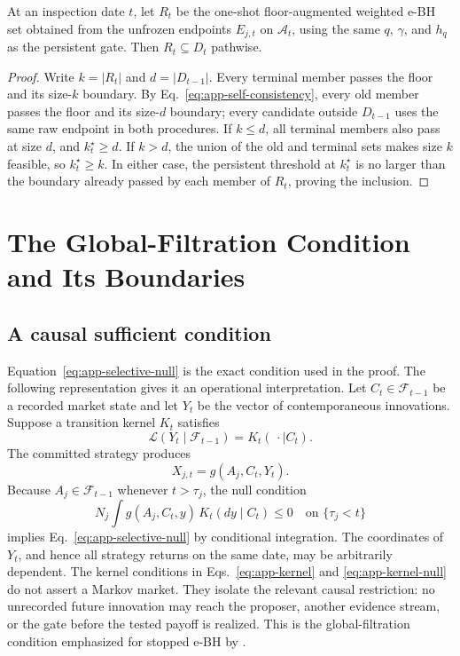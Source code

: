 \begin{proposition}
\label{prop:app-terminal-containment}
At an inspection date \(t\), let \(R_t\) be the one-shot floor-augmented
weighted e-BH set obtained from the unfrozen endpoints \(E_{j,t}\) on
\(\mathcal A_t\), using the same \(q\), \(\gamma\), and \(h_q\) as the
persistent gate.  Then \(R_t\subseteq D_t\) pathwise.
\end{proposition}

\begin{proof}
Write \(k=|R_t|\) and \(d=|D_{t-1}|\).  Every terminal member passes the
floor and its size-\(k\) boundary.  By
Eq.~\eqref{eq:app-self-consistency}, every old member passes the floor and its
size-\(d\) boundary; every candidate outside \(D_{t-1}\) uses the same raw
endpoint in both procedures.  If \(k\leq d\), all terminal members also pass
at size \(d\), and \(k_t^\star\geq d\).  If \(k>d\), the union of the old and
terminal sets makes size \(k\) feasible, so \(k_t^\star\geq k\).  In either
case, the persistent threshold at \(k_t^\star\) is no larger than the boundary
already passed by each member of \(R_t\), proving the inclusion.
\end{proof}

\section{The Global-Filtration Condition and Its Boundaries}
\label{app:causal}

\subsection{A causal sufficient condition}

Equation~\eqref{eq:app-selective-null} is the exact condition used in the
proof.  The following representation gives it an operational interpretation.
Let \(C_t\in\mathcal F_{t-1}\) be a recorded market state and let \(Y_t\) be
the vector of contemporaneous innovations.  Suppose a transition kernel
\(K_t\) satisfies
\begin{equation}
  \mathcal L(Y_t\mid\mathcal F_{t-1})
  =K_t(\,\cdot\mid C_t).
  \label{eq:app-kernel}
\end{equation}
The committed strategy produces
\[
  X_{j,t}=g(A_j,C_t,Y_t).
\]
Because \(A_j\in\mathcal F_{t-1}\) whenever \(t>\tau_j\), the null condition
\begin{equation}
 N_j\int g(A_j,C_t,y)\,K_t(dy\mid C_t)\leq0
 \quad\text{on }\{\tau_j<t\}
 \label{eq:app-kernel-null}
\end{equation}
implies Eq.~\eqref{eq:app-selective-null} by conditional integration.  The
coordinates of \(Y_t\), and hence all strategy returns on the same date, may
be arbitrarily dependent.  The kernel conditions in
Eqs.~\eqref{eq:app-kernel} and \eqref{eq:app-kernel-null} do not assert a Markov
market.  They isolate the relevant causal restriction: no unrecorded
future innovation may reach the proposer, another evidence stream, or the
gate before the tested payoff is realized.  This is the global-filtration
condition emphasized for stopped e-BH by
\citet{wang2025stopped}.

